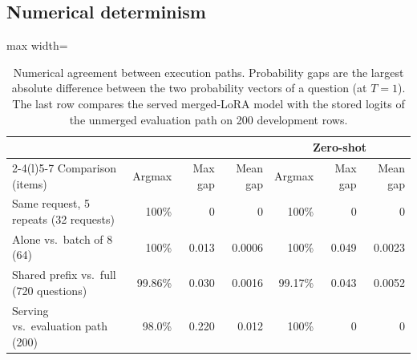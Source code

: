 \subsection{Numerical determinism}
\label{sec:determinism}

\begin{table}[t]
\centering
\small
\caption{Numerical agreement between execution paths. Probability gaps are the largest
absolute difference between the two probability vectors of a question (at $T=1$). The last
row compares the served merged-LoRA model with the stored logits of the unmerged evaluation
path on 200 development rows.}
\label{tab:determinism}
\setlength{\tabcolsep}{4pt}
\begin{adjustbox}{max width=\linewidth}
\begin{tabular}{@{}lrrrrrr@{}}
\toprule
 & \multicolumn{3}{c}{\expone{}} & \multicolumn{3}{c}{Zero-shot} \\
\cmidrule(lr){2-4}\cmidrule(l){5-7}
Comparison (items) & Argmax & Max gap & Mean gap & Argmax & Max gap & Mean gap \\
\midrule
Same request, 5 repeats (32 requests) & 100\% & 0 & 0 & 100\% & 0 & 0 \\
Alone vs.\ batch of 8 (64) & 100\% & 0.013 & 0.0006 & 100\% & 0.049 & 0.0023 \\
Shared prefix vs.\ full (720 questions) & 99.86\% & 0.030 & 0.0016 & 99.17\% & 0.043 & 0.0052 \\
Serving vs.\ evaluation path (200) & 98.0\% & 0.220 & 0.012 & 100\% & 0 & 0 \\
\bottomrule
\end{tabular}
\end{adjustbox}
\end{table}

